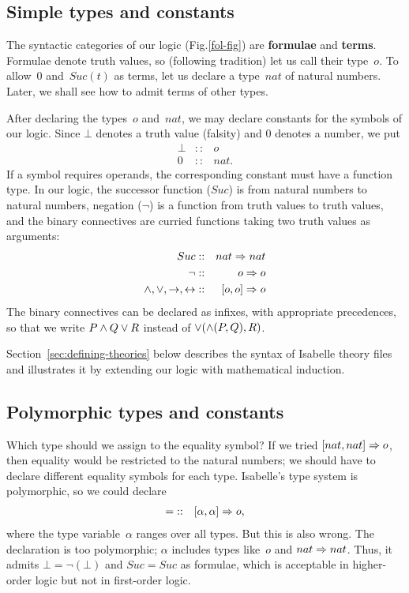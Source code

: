 \subsection{Simple types and constants}

The syntactic categories of our logic (Fig.\ts\ref{fol-fig}) are {\bf
formulae} and {\bf terms}. Formulae denote truth values, so (following
tradition) let us call their type~$o$. To allow~0 and~$Suc(t)$ as terms,
let us declare a type~$nat$ of natural numbers. Later, we shall see
how to admit terms of other types.

After declaring the types~$o$ and~$nat$, we may declare constants for the
symbols of our logic. Since $\bot$ denotes a truth value (falsity) and 0
denotes a number, we put \begin{eqnarray*}
                             \bot  & :: & o \\
                             0     & :: & nat.
\end{eqnarray*}
If a symbol requires operands, the corresponding constant must have a
function type. In our logic, the successor function
($Suc$) is from natural numbers to natural numbers, negation ($\neg$) is a
function from truth values to truth values, and the binary connectives are
curried functions taking two truth values as arguments:
\begin{eqnarray*}
    Suc    & :: & nat\Rightarrow nat  \\
    {\neg} & :: & o\Rightarrow o      \\
    \wedge,\vee,\rightarrow,\leftrightarrow  & :: & [o,o]\Rightarrow o
\end{eqnarray*}
The binary connectives can be declared as infixes, with appropriate
precedences, so that we write $P\wedge Q\vee R$ instead of
$\vee(\wedge(P,Q), R)$.

Section~\ref{sec:defining-theories} below describes the syntax of Isabelle
theory files and illustrates it by extending our logic with mathematical
induction.

\subsection{Polymorphic types and constants} \label{polymorphic}

Which type should we assign to the equality symbol? If we tried
$[nat,nat]\Rightarrow o$, then equality would be restricted to the natural
numbers; we should have to declare different equality symbols for each
type. Isabelle's type system is polymorphic, so we could declare
\begin{eqnarray*}
{=}
    & :: & [\alpha,\alpha]\Rightarrow o,
\end{eqnarray*}
where the type variable~$\alpha$ ranges over all types.
But this is also wrong. The declaration is too polymorphic; $\alpha$
includes types like~$o$ and $nat\Rightarrow nat$. Thus, it admits
$\bot=\neg(\bot)$ and $Suc=Suc$ as formulae, which is acceptable in
higher-order logic but not in first-order logic.

